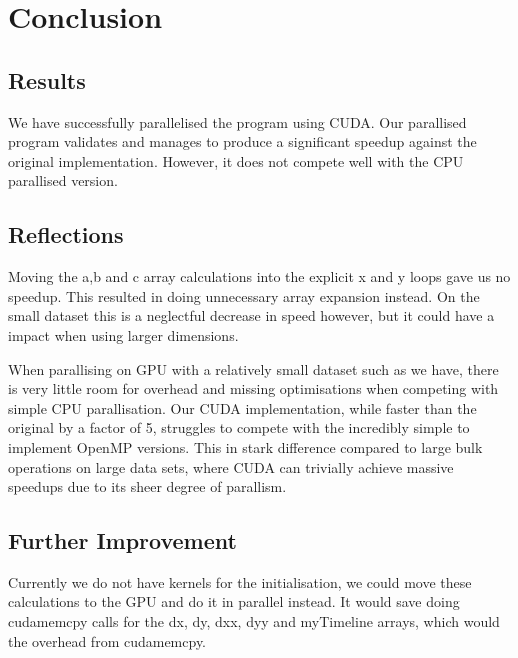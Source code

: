 \section{Conclusion}
\subsection{Results}
We have successfully parallelised the program using CUDA. Our parallised program validates and manages to produce a significant speedup against
 the original implementation. However, it does not compete well with the CPU parallised version.
\subsection{Reflections}
Moving the a,b and c array calculations into the explicit x and y loops gave us no speedup. This resulted in doing unnecessary  array expansion instead. On the small dataset this is a neglectful decrease in speed however, but it could have a impact when using larger dimensions.

When parallising on GPU with a relatively small dataset such as we have, there is very little room for overhead and missing optimisations
 when competing
 with simple CPU parallisation. Our CUDA implementation, while faster than the original by a factor of 5, struggles to compete with the
 incredibly simple to implement OpenMP versions. This in stark difference compared to large bulk operations on large data sets,
 where CUDA can
 trivially achieve massive speedups due to its sheer degree of parallism.

\subsection{Further Improvement}
Currently we do not have kernels for the initialisation, we could move these calculations to the GPU and do it in parallel instead. It would save doing cudamemcpy calls for the dx, dy, dxx, dyy and myTimeline arrays, which would the overhead from cudamemcpy.